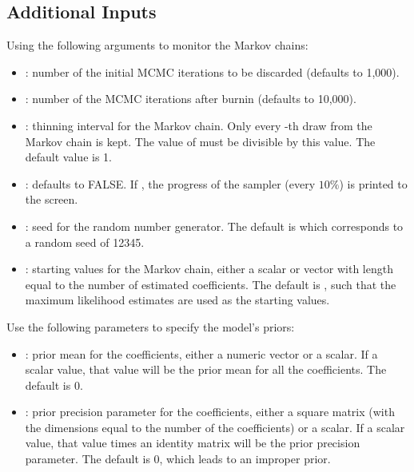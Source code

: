 \documentclass[letterpaper,10pt,english]{sphinxmanual}
\begin{document}
\subsection{Additional Inputs}
\label{vignette:id109}
Using the following arguments to monitor the Markov chains:
\begin{itemize}
\item {} 
: number of the initial MCMC iterations to be discarded
(defaults to 1,000).

\item {} 
: number of the MCMC iterations after burnin (defaults to
10,000).

\item {} 
: thinning interval for the Markov chain. Only every
-th draw from the Markov chain is kept. The value of 
must be divisible by this value. The default value is 1.

\item {} 
: defaults to FALSE. If , the progress of the
sampler (every \(10\%\)) is printed to the screen.

\item {} 
: seed for the random number generator. The default is 
which corresponds to a random seed of 12345.

\item {} 
: starting values for the Markov chain, either a scalar
or vector with length equal to the number of estimated coefficients.
The default is , such that the maximum likelihood estimates are
used as the starting values.

\end{itemize}

Use the following parameters to specify the model’s priors:
\begin{itemize}
\item {} 
: prior mean for the coefficients, either a numeric vector or a
scalar. If a scalar value, that value will be the prior mean for all
the coefficients. The default is 0.

\item {} 
: prior precision parameter for the coefficients, either a
square matrix (with the dimensions equal to the number of the
coefficients) or a scalar. If a scalar value, that value times an
identity matrix will be the prior precision parameter. The default is
0, which leads to an improper prior.

\end{itemize}
\end{document}
